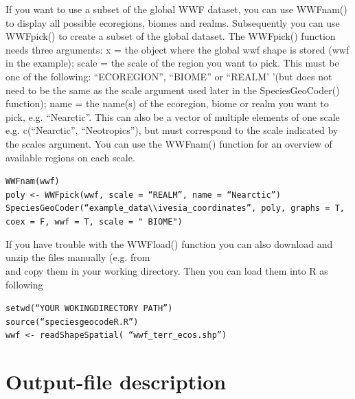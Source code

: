 \documentclass[a4paper,titlepage,11pt]{scrreprt}
\begin{document}
If you want to use a subset of the global WWF dataset, you can use WWFnam() to display all possible ecoregions, biomes and realms. Subsequently you can use WWFpick()  to create a subset of the global dataset. The WWFpick() function needs three  arguments: x = the object where the global wwf shape is stored (wwf in the example); scale  = the scale of the region you want to pick. This must be one of the following: ``ECOREGION'', ``BIOME'' or ``REALM' '(but does not need to be the same as the scale argument used later in the SpeciesGeoCoder() function);  name = the name(s) of the ecoregion, biome or realm you want to pick, e.g. ``Nearctic''. This can also be a vector of multiple elements of one scale e.g. c(``Nearctic'', ``Neotropics''), but must correspond to the scale indicated by the scales argument. You can use the WWFnam() function for an overview of available regions on each scale.

\texttt{WWFnam(wwf)}\\
\texttt{poly \textless- WWFpick(wwf,  scale = ``REALM'', name  = ``Nearctic'')}\\
\texttt{SpeciesGeoCoder(``example\_data\textbackslash \textbackslash  ivesia\_coordinates'', poly,  graphs = T, coex = F, wwf = T, scale = " BIOME") }

If you have trouble with the WWFload() function you can also download and unzip the files manually  (e.g. from \citealt{wwfeco}\\
 and copy them in your working directory. Then you can load them into R as following

\texttt{setwd(``YOUR WOKINGDIRECTORY PATH'')}\\
\texttt{source(``speciesgeocodeR.R'')}\\
\texttt{wwf \textless- readShapeSpatial( ``wwf\_terr\_ecos.shp'')}

\chapter{Output-file description} \label{output}
\end{document}
